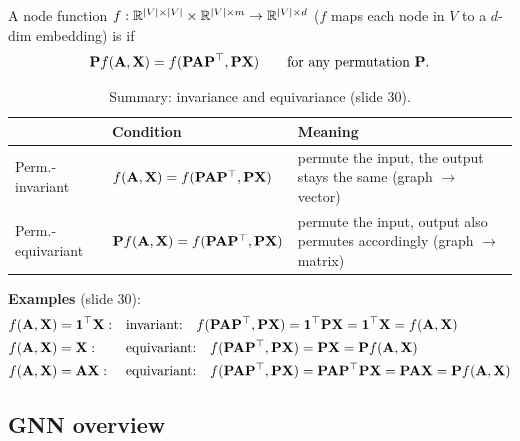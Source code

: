 \begin{definition}\label{def:lec03-perm-eqv}
  A node function $f:\mathbb{R}^{|V|\times|V|}\times\mathbb{R}^{|V|\times m}\to\mathbb{R}^{|V|\times d}$
  ($f$ maps each node in $V$ to a $d$-dim embedding) is  if
  \begin{equation}\label{eq:lec03-perm-eqv}
    \mathbf{P} f(\mathbf{A},\mathbf{X}) = f(\mathbf{P}\mathbf{A}\mathbf{P}^{\top},\mathbf{P}\mathbf{X})\qquad\text{for any permutation } \mathbf{P} .
  \end{equation}
\end{definition}

\begin{table}[htbp]
  \centering
  \small
  \begin{tabularx}{\linewidth}{@{}ll>{\raggedright\arraybackslash}X@{}}
    \toprule
    & Condition & Meaning \\
    \midrule
    Perm.-invariant & $f(\mathbf{A},\mathbf{X})=f(\mathbf{P}\mathbf{A}\mathbf{P}^{\top},\mathbf{P}\mathbf{X})$ &
      permute the input, the output stays the same (graph $\to$ vector) \\
    Perm.-equivariant & $\mathbf{P} f(\mathbf{A},\mathbf{X})=f(\mathbf{P}\mathbf{A}\mathbf{P}^{\top},\mathbf{P}\mathbf{X})$ &
      permute the input, output also permutes accordingly (graph $\to$ matrix) \\
    \bottomrule
  \end{tabularx}
  \caption{Summary: invariance and equivariance (slide 30).}
  \label{tab:lec03-inv-eqv}
\end{table}

\textbf{Examples} (slide 30):
\begin{align}
  f(\mathbf{A},\mathbf{X})&=\mathbf{1}^{\top}\mathbf{X}: &&\text{invariant:}\quad f(\mathbf{P}\mathbf{A}\mathbf{P}^{\top},\mathbf{P}\mathbf{X})=\mathbf{1}^{\top}\mathbf{P}\mathbf{X}=\mathbf{1}^{\top}\mathbf{X}=f(\mathbf{A},\mathbf{X})\notag\\
  f(\mathbf{A},\mathbf{X})&=\mathbf{X}: &&\text{equivariant:}\quad f(\mathbf{P}\mathbf{A}\mathbf{P}^{\top},\mathbf{P}\mathbf{X})=\mathbf{P}\mathbf{X}=\mathbf{P} f(\mathbf{A},\mathbf{X})\label{eq:lec03-inv-eqv-ex}\\
  f(\mathbf{A},\mathbf{X})&=\mathbf{A}\mathbf{X}: &&\text{equivariant:}\quad f(\mathbf{P}\mathbf{A}\mathbf{P}^{\top},\mathbf{P}\mathbf{X})=\mathbf{P}\mathbf{A}\mathbf{P}^{\top}\mathbf{P}\mathbf{X}=\mathbf{P}\mathbf{A}\mathbf{X}=\mathbf{P} f(\mathbf{A},\mathbf{X})\notag
\end{align}

\subsection{GNN overview}\label{sec:lec03-overview}

